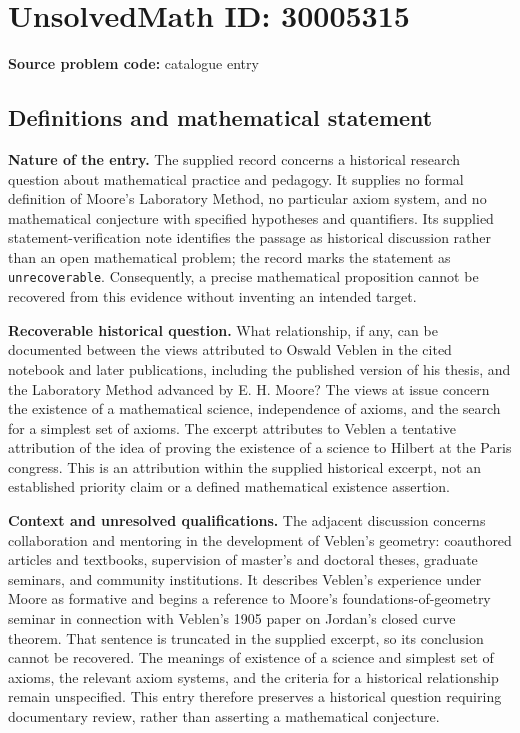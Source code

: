 \documentclass[11pt]{article}
\begin{document}
\section*{UnsolvedMath ID: 30005315}
\textbf{Source problem code:} catalogue entry
\subsection{Definitions and mathematical statement}
\textbf{Nature of the entry.} The supplied record concerns a historical research question about mathematical practice and pedagogy. It supplies no formal definition of Moore's Laboratory Method, no particular axiom system, and no mathematical conjecture with specified hypotheses and quantifiers. Its supplied statement-verification note identifies the passage as historical discussion rather than an open mathematical problem; the record marks the statement as \texttt{unrecoverable}. Consequently, a precise mathematical proposition cannot be recovered from this evidence without inventing an intended target.

\textbf{Recoverable historical question.} What relationship, if any, can be documented between the views attributed to Oswald Veblen in the cited notebook and later publications, including the published version of his thesis, and the Laboratory Method advanced by E. H. Moore? The views at issue concern the existence of a mathematical science, independence of axioms, and the search for a simplest set of axioms. The excerpt attributes to Veblen a tentative attribution of the idea of proving the existence of a science to Hilbert at the Paris congress. This is an attribution within the supplied historical excerpt, not an established priority claim or a defined mathematical existence assertion.

\textbf{Context and unresolved qualifications.} The adjacent discussion concerns collaboration and mentoring in the development of Veblen's geometry: coauthored articles and textbooks, supervision of master's and doctoral theses, graduate seminars, and community institutions. It describes Veblen's experience under Moore as formative and begins a reference to Moore's foundations-of-geometry seminar in connection with Veblen's 1905 paper on Jordan's closed curve theorem. That sentence is truncated in the supplied excerpt, so its conclusion cannot be recovered. The meanings of existence of a science and simplest set of axioms, the relevant axiom systems, and the criteria for a historical relationship remain unspecified. This entry therefore preserves a historical question requiring documentary review, rather than asserting a mathematical conjecture.
\end{document}

